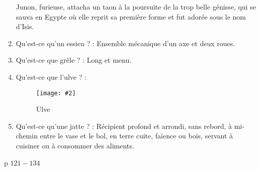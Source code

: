 \documentclass[a4paper, 11pt, hidelinks]{article}
\newcommand{\img}[4]{\begin{figure}[!ht]
    \centering
    \texttt{[image: \#2]}
    \caption{#3}
    \label{#4}
    \end{figure} }
\begin{document}
\begin{enumerate}
            Junon, furieuse, attacha un taon à la poursuite de la trop belle génisse, qui se sauva en Egypte où elle reprit sa première forme et fut adorée sous le nom d'Isis.
      \item Qu'est-ce qu'un essieu ? : Ensemble mécanique d'un axe et deux roues.
      \item Qu'est-ce que grêle ? : Long et menu.
      \item Qu'est-ce que l'ulve ? :
            \img{0.2}{Ulve.jpg}{Ulve}{121}
      \item Qu'est-ce qu'une jatte ? : Récipient profond et arrondi, sans rebord, à mi-chemin entre le vase et le bol, en terre cuite, faïence ou bois, servant à cuisiner ou à consommer des aliments.
\end{enumerate}


p $121 - 134$
\end{document}
